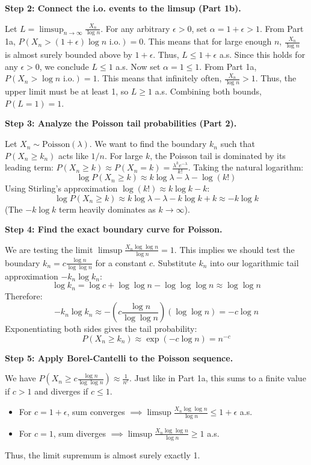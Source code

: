 \begin{solution}
\textbf{Step 2: Connect the i.o. events to the limsup (Part 1b).}

Let $L = \limsup_{n \to \infty} \frac{X_n}{\log n}$.
For any arbitrary $\epsilon > 0$, set $\alpha = 1 + \epsilon > 1$. From Part 1a, $P(X_n > (1+\epsilon) \log n \text{ i.o.}) = 0$.
This means that for large enough $n$, $\frac{X_n}{\log n}$ is almost surely bounded above by $1+\epsilon$. Thus, $L \leq 1+\epsilon$ a.s. Since this holds for any $\epsilon > 0$, we conclude $L \leq 1$ a.s.
Now set $\alpha = 1 \leq 1$. From Part 1a, $P(X_n > \log n \text{ i.o.}) = 1$.
This means that infinitely often, $\frac{X_n}{\log n} > 1$. Thus, the upper limit must be at least 1, so $L \geq 1$ a.s.
Combining both bounds, $P(L = 1) = 1$.

\textbf{Step 3: Analyze the Poisson tail probabilities (Part 2).}

Let $X_n \sim \text{Poisson}(\lambda)$. We want to find the boundary $k_n$ such that $P(X_n \geq k_n)$ acts like $1/n$.
For large $k$, the Poisson tail is dominated by its leading term: $P(X_n \geq k) \approx P(X_n = k) = \frac{\lambda^k e^{-\lambda}}{k!}$.
Taking the natural logarithm:
\[ \log P(X_n \geq k) \approx k \log \lambda - \lambda - \log(k!) \]
Using Stirling's approximation $\log(k!) \approx k \log k - k$:
\[ \log P(X_n \geq k) \approx k \log \lambda - \lambda - k \log k + k \approx -k \log k \]
(The $-k \log k$ term heavily dominates as $k \to \infty$).

\textbf{Step 4: Find the exact boundary curve for Poisson.}

We are testing the limit $\limsup \frac{X_n \log \log n}{\log n} = 1$. This implies we should test the boundary $k_n = c \frac{\log n}{\log \log n}$ for a constant $c$.
Substitute $k_n$ into our logarithmic tail approximation $-k_n \log k_n$:
\[ \log k_n = \log c + \log \log n - \log \log \log n \approx \log \log n \]
Therefore:
\[ -k_n \log k_n \approx - \left( c \frac{\log n}{\log \log n} \right) (\log \log n) = -c \log n \]
Exponentiating both sides gives the tail probability:
\[ P(X_n \geq k_n) \approx \exp(-c \log n) = n^{-c} \]

\textbf{Step 5: Apply Borel-Cantelli to the Poisson sequence.}

We have $P\left(X_n \geq c \frac{\log n}{\log \log n}\right) \approx \frac{1}{n^c}$.
Just like in Part 1a, this sums to a finite value if $c > 1$ and diverges if $c \leq 1$.
\begin{itemize}
    \item For $c = 1+\epsilon$, sum converges $\implies \limsup \frac{X_n \log \log n}{\log n} \leq 1+\epsilon$ a.s.
    \item For $c = 1$, sum diverges $\implies \limsup \frac{X_n \log \log n}{\log n} \geq 1$ a.s.
\end{itemize}
Thus, the limit supremum is almost surely exactly 1.
\end{solution}

